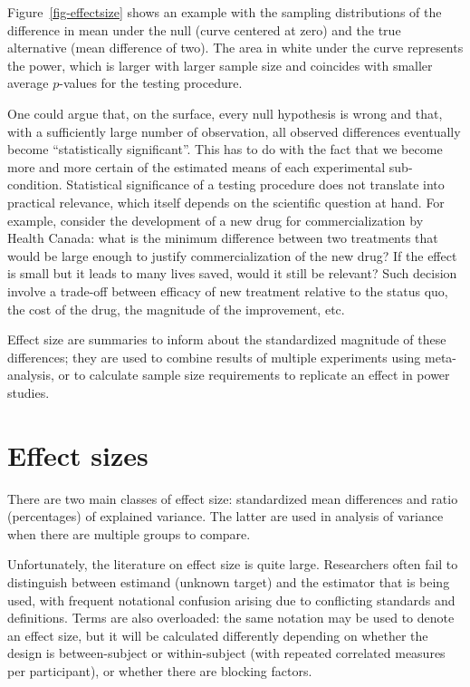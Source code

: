 \documentclass[
  11pt,
  letterpaper,
]{scrbook}
\theoremstyle{definition}
\theoremstyle{remark}
\begin{document}
Figure~\ref{fig-effectsize} shows an example with the sampling
distributions of the difference in mean under the null (curve centered
at zero) and the true alternative (mean difference of two). The area in
white under the curve represents the power, which is larger with larger
sample size and coincides with smaller average \(p\)-values for the
testing procedure.

One could argue that, on the surface, every null hypothesis is wrong and
that, with a sufficiently large number of observation, all observed
differences eventually become ``statistically significant''. This has to
do with the fact that we become more and more certain of the estimated
means of each experimental sub-condition. Statistical significance of a
testing procedure does not translate into practical relevance, which
itself depends on the scientific question at hand. For example, consider
the development of a new drug for commercialization by Health Canada:
what is the minimum difference between two treatments that would be
large enough to justify commercialization of the new drug? If the effect
is small but it leads to many lives saved, would it still be relevant?
Such decision involve a trade-off between efficacy of new treatment
relative to the status quo, the cost of the drug, the magnitude of the
improvement, etc.

Effect size are summaries to inform about the standardized magnitude of
these differences; they are used to combine results of multiple
experiments using meta-analysis, or to calculate sample size
requirements to replicate an effect in power studies.

\hypertarget{effect-sizes}{%
\section{Effect sizes}\label{effect-sizes}}

There are two main classes of effect size: standardized mean differences
and ratio (percentages) of explained variance. The latter are used in
analysis of variance when there are multiple groups to compare.

Unfortunately, the literature on effect size is quite large. Researchers
often fail to distinguish between estimand (unknown target) and the
estimator that is being used, with frequent notational confusion arising
due to conflicting standards and definitions. Terms are also overloaded:
the same notation may be used to denote an effect size, but it will be
calculated differently depending on whether the design is
between-subject or within-subject (with repeated correlated measures per
participant), or whether there are blocking factors.
\end{document}
